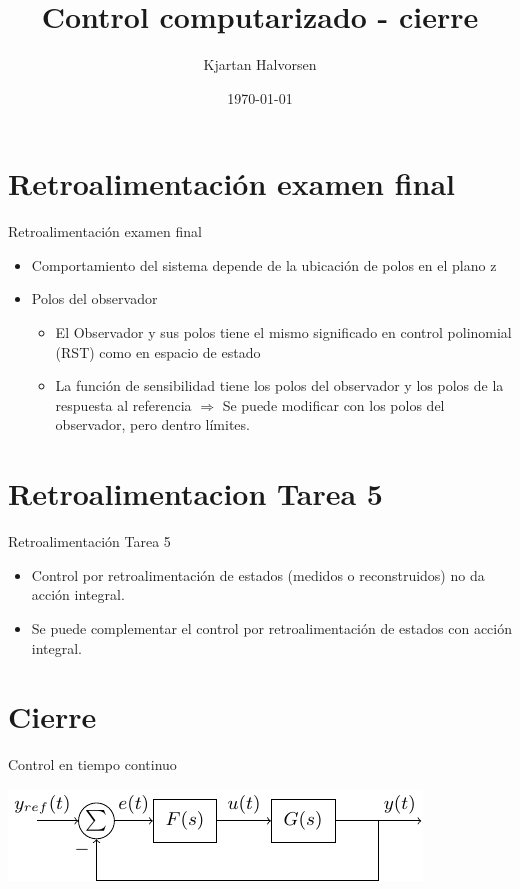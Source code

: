 \documentclass[presentation,aspectratio=169]{beamer}
\author{Kjartan Halvorsen}
\date{\today}
\title{Control computarizado - cierre}
\begin{document}
\maketitle


\section{Retroalimentación examen final}
\label{sec:org0163bc2}


\begin{frame}[label={sec:org8d832b1}]{Retroalimentación examen final}
\begin{itemize}
\item Comportamiento del sistema depende de la ubicación de polos en el plano z
\item Polos del observador
\begin{itemize}
\item El \alert{Observador} y sus polos tiene el mismo significado en control polinomial (RST) como en espacio de estado
\item La \alert{función de sensibilidad} tiene los polos del observador \alert{y} los polos de la respuesta al referencia \(\Rightarrow\) Se puede modificar con los polos del observador, pero dentro límites.
\end{itemize}
\end{itemize}
\end{frame}

\section{Retroalimentacion Tarea 5}
\label{sec:orge2a87ec}

\begin{frame}[label={sec:orgf52f999}]{Retroalimentación Tarea 5}
\begin{itemize}
\item Control por retroalimentación de estados (medidos o reconstruidos) \alert{no da acción integral}.
\item Se puede \alert{complementar} el control por retroalimentación de estados con acción integral.
\end{itemize}
\end{frame}

\section{Cierre}
\label{sec:org5488f81}


\begin{frame}[label={sec:orgaab05c4}]{Control en tiempo continuo}
\begin{center}
\includegraphics[width=0.6\linewidth]{../../figures/block1}
\end{center}
\end{frame}
\end{document}
